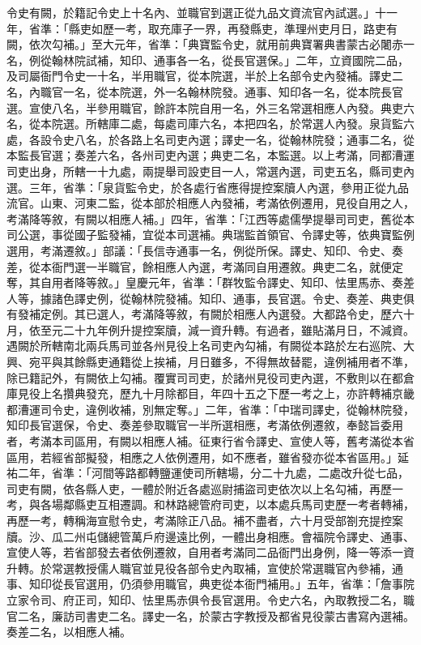 \begin{pinyinscope}
令史有闕，於籍記令史上十名內、並職官到選正從九品文資流官內試選。」十一年，省準：「縣吏如歷一考，取充庫子一界，再發縣吏，準理州吏月日，路吏有闕，依次勾補。」至大元年，省準：「典寶監令史，就用前典寶署典書蒙古必闍赤一名，例從翰林院試補，知印、通事各一名，從長官選保。」二年，立資國院二品，及司屬衙門令史一十名，半用職官，從本院選，半於上名部令史內發補。譯史二名，內職官一名，從本院選，外一名翰林院發。通事、知印各一名，從本院長官選。宣使八名，半參用職官，餘許本院自用一名，外三名常選相應人內發。典吏六名，從本院選。所轄庫二處，每處司庫六名，本把四名，於常選人內發。泉貨監六處，各設令史八名，於各路上名司吏內選；譯史一名，從翰林院發；通事二名，從本監長官選；奏差六名，各州司吏內選；典吏二名，本監選。以上考滿，同都漕運司吏出身，所轄一十九處，兩提舉司設吏目一人，常選內選，司吏五名，縣司吏內選。三年，省準：「泉貨監令史，於各處行省應得提控案牘人內選，參用正從九品流官。山東、河東二監，從本部於相應人內發補，考滿依例遷用，見役自用之人，考滿降等敘，有闕以相應人補。」四年，省準：「江西等處儒學提舉司司吏，舊從本司公選，事從國子監發補，宜從本司選補。典瑞監首領官、令譯史等，依典寶監例選用，考滿遷敘。」部議：「長信寺通事一名，例從所保。譯史、知印、令史、奏差，從本衙門選一半職官，餘相應人內選，考滿同自用遷敘。典吏二名，就便定奪，其自用者降等敘。」皇慶元年，省準：「群牧監令譯史、知印、怯里馬赤、奏差人等，據諸色譯史例，從翰林院發補。知印、通事，長官選。令史、奏差、典吏俱有發補定例。其已選人，考滿降等敘，有闕於相應人內選發。大都路令史，歷六十月，依至元二十九年例升提控案牘，減一資升轉。有過者，雖貼滿月日，不減資。遇闕於所轄南北兩兵馬司並各州見役上名司吏內勾補，有闕從本路於左右巡院、大興、宛平與其餘縣吏通籍從上挨補，月日雖多，不得無故替罷，違例補用者不準，除已籍記外，有闕依上勾補。覆實司司吏，於諸州見役司吏內選，不敷則以在都倉庫見役上名攢典發充，歷九十月除都目，年四十五之下歷一考之上，亦許轉補京畿都漕運司令史，違例收補，別無定奪。」二年，省準：「中瑞司譯史，從翰林院發，知印長官選保，令史、奏差參取職官一半所選相應，考滿依例遷敘，奉懿旨委用者，考滿本司區用，有闕以相應人補。征東行省令譯史、宣使人等，舊考滿從本省區用，若經省部擬發，相應之人依例遷用，如不應者，雖省發亦從本省區用。」延祐二年，省準：「河間等路都轉鹽運使司所轄場，分二十九處，二處改升從七品，司吏有闕，依各縣人吏，一體於附近各處巡尉捕盜司吏依次以上名勾補，再歷一考，與各場鄰縣吏互相遷調。和林路總管府司吏，以本處兵馬司吏歷一考者轉補，再歷一考，轉稱海宣慰令史，考滿除正八品。補不盡者，六十月受部劄充提控案牘。沙、瓜二州屯儲總管萬戶府邊遠比例，一體出身相應。會福院令譯史、通事、宣使人等，若省部發去者依例遷敘，自用者考滿同二品衙門出身例，降一等添一資升轉。於常選教授儒人職官並見役各部令史內取補，宣使於常選職官內參補，通事、知印從長官選用，仍須參用職官，典吏從本衙門補用。」五年，省準：「詹事院立家令司、府正司，知印、怯里馬赤俱令長官選用。令史六名，內取教授二名，職官二名，廉訪司書吏二名。譯史一名，於蒙古字教授及都省見役蒙古書寫內選補。奏差二名，以相應人補。




\end{pinyinscope}
